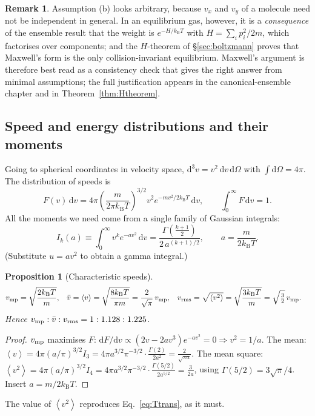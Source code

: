 \documentclass[11pt,a4paper]{report}
\theoremstyle{definition}
\newtheorem{remark}[definition]{Remark}
\theoremstyle{plain}
\newtheorem{proposition}[definition]{Proposition}
\newcommand{\kB}{k_{\mathrm{B}}}
\newcommand{\dd}{\mathrm{d}}
\newcommand{\avg}[1]{\left\langle #1\right\rangle}
\newcommand{\vbar}{\bar{v}}
\begin{document}
\begin{remark}
Assumption (b) looks arbitrary, because $v_x$ and $v_y$ of a molecule need not be independent in general. In an equilibrium gas, however, it is a \emph{consequence} of the ensemble result that the weight is $e^{-H/\kB T}$ with $H=\sum_i p_i^2/2m$, which factorises over components; and the $H$-theorem of \S\ref{sec:boltzmann} proves that Maxwell's form is the only collision-invariant equilibrium. Maxwell's argument is therefore best read as a consistency check that gives the right answer from minimal assumptions; the full justification appears in the canonical-ensemble chapter and in Theorem~\ref{thm:Htheorem}.
\end{remark}

\subsection{Speed and energy distributions and their moments}

Going to spherical coordinates in velocity space, $\dd^3v=v^2\,\dd v\,\dd\Omega$ with $\int\dd\Omega=4\pi$. The distribution of speeds is
\begin{equation}
F(v)\,\dd v=4\pi\left(\frac{m}{2\pi\kB T}\right)^{3/2}v^2e^{-mv^2/2\kB T}\,\dd v,\qquad\int_0^\infty F\,\dd v=1.
\label{eq:speeddist}
\end{equation}
All the moments we need come from a single family of Gaussian integrals:
\begin{equation}
I_k(a)\equiv\int_0^\infty v^k e^{-av^2}\,\dd v=\frac{\Gamma\!\left(\frac{k+1}{2}\right)}{2\,a^{(k+1)/2}},\qquad a=\frac{m}{2\kB T}.
\label{eq:gaussint}
\end{equation}
(Substitute $u=av^2$ to obtain a gamma integral.)

\begin{proposition}[Characteristic speeds]\label{prop:speeds}
\begin{align}
v_{\rm mp}&=\sqrt{\frac{2\kB T}{m}},&
\vbar=\avg{v}&=\sqrt{\frac{8\kB T}{\pi m}}=\frac{2}{\sqrt\pi}\,v_{\rm mp},&
v_{\rm rms}&=\sqrt{\avg{v^2}}=\sqrt{\frac{3\kB T}{m}}=\sqrt{\tfrac32}\,v_{\rm mp}.
\end{align}
Hence $v_{\rm mp}:\vbar:v_{\rm rms}=1:1.128:1.225$.
\end{proposition}
\begin{proof}
$v_{\rm mp}$ maximises $F$: $\dd F/\dd v\propto (2v-2av^3)e^{-av^2}=0\Rightarrow v^2=1/a$. The mean: $\avg{v}=4\pi(a/\pi)^{3/2}I_3=4\pi a^{3/2}\pi^{-3/2}\cdot\frac{\Gamma(2)}{2a^2}=\frac{2}{\sqrt{\pi a}}$. The mean square: $\avg{v^2}=4\pi(a/\pi)^{3/2}I_4=4\pi a^{3/2}\pi^{-3/2}\cdot\frac{\Gamma(5/2)}{2a^{5/2}}=\frac{3}{2a}$, using $\Gamma(5/2)=3\sqrt\pi/4$. Insert $a=m/2\kB T$.
\end{proof}
The value of $\avg{v^2}$ reproduces Eq.~\eqref{eq:Ttrans}, as it must.
\end{document}
